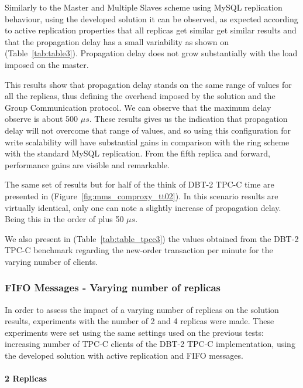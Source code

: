 Similarly to the Master and Multiple Slaves scheme using MySQL replication behaviour, using the developed solution it can be observed, as expected according to active replication properties that all replicas get similar get similar results and that the propagation delay has a small variability as shown on (Table~\ref{tab:table3}). Propagation delay does not grow substantially with the load imposed on the master. 

This results show that propagation delay stands on the same range of values for all the replicas, thus defining the overhead imposed by the solution and the Group Communication protocol. We can observe that the maximum delay observe is about 500 $\mu{}s$. These results gives us the indication that propagation delay will not overcome that range of values, and so using this configuration for write scalability will have substantial gains in comparison with the ring scheme with the standard MySQL replication. From the fifth replica and forward, performance gains are visible and remarkable.  



The same set of results but for half of the think of DBT-2 TPC-C time are presented in (Figure~\ref{fig:mms_comproxy_tt02}). In this scenario results are virtually identical, only one can note a slightly increase of propagation delay. Being this in the order of plus 50 $\mu{}s$.  

We also present in (Table~\ref{tab:table_tpcc3}) the values obtained from the DBT-2 TPC-C benchmark regarding the new-order transaction per minute for the varying number of clients.


\subsubsection{FIFO Messages - Varying number of replicas}

In order to assess the impact of a varying number of replicas on the solution results, experiments with the number of 2 and 4 replicas were made. These experiments were set using the same settings used on the previous tests: increasing number of TPC-C clients of the DBT-2 TPC-C implementation, using the developed solution with active replication and FIFO messages.

\vspace{20mm}
\paragraph{2 Replicas\\ \\}

